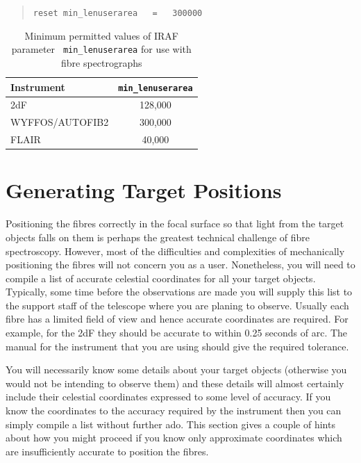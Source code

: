\documentclass[twoside,11pt]{article}
\newcommand{\xlabel}[1]{}
\begin{document}
\begin{quote}
{\tt reset min\_lenuserarea ~ = ~ 300000}
\end{quote}

\begin{table}[htbp]

\begin{center}
\begin{tabular}{lc}
Instrument      & {\tt min\_lenuserarea} \\ \hline
2dF             & 128,000 \\
WYFFOS/AUTOFIB2 & 300,000 \\
FLAIR           &  40,000 \\
\end{tabular}
\end{center}

\begin{quote}
\caption[Values of IRAF parameter {\tt min\_lenuserarea} for fibre
spectrographs]{Minimum permitted values of IRAF parameter {\tt
min\_lenuserarea} for use with fibre spectrographs
\label{MINLENUSERAREA} }
\end{quote}

\end{table}


\section{\xlabel{TARGET}\label{TARGET}Generating Target Positions}

Positioning the fibres correctly in the focal surface so that light
from the target objects falls on them is perhaps the greatest technical
challenge of fibre spectroscopy.  However, most of the difficulties and
complexities of mechanically positioning the fibres will not concern
you as a user.  Nonetheless, you will need to compile a list of accurate
celestial coordinates for all your target objects.  Typically, some
time before the observations are made you will supply this list to
the support staff of the telescope where you are planing to observe.
Usually each fibre has a limited field of view and hence accurate
coordinates are required.  For example, for the 2dF they should be
accurate to within 0.25 seconds of arc.  The manual for the instrument
that you are using should give the required tolerance.

You will necessarily know some details about your target objects
(otherwise you would not be intending to observe them) and these details
will almost certainly include their celestial coordinates expressed to
some level of accuracy.  If you know the coordinates to the accuracy
required by the instrument then you can simply compile a list without
further ado.  This section gives a couple of hints about how you might
proceed if you know only approximate coordinates which are
insufficiently accurate to position the fibres.
\end{document}

